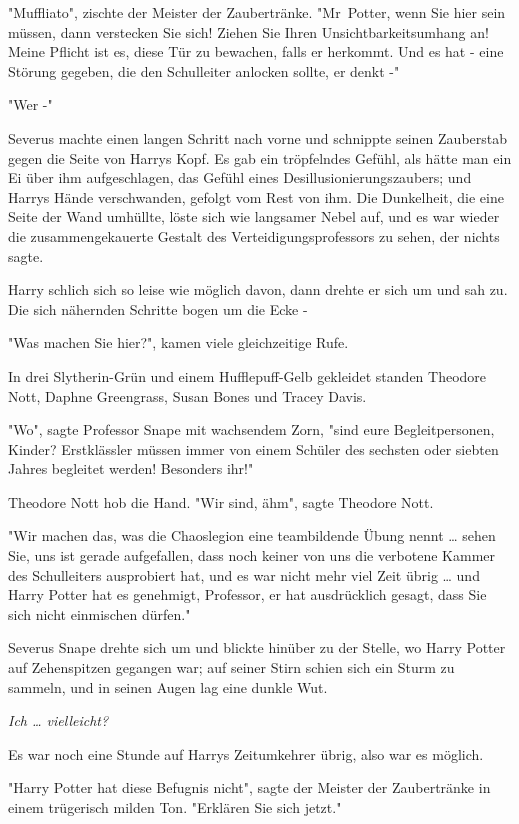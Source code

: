 {"Muffliato", zischte der Meister der Zaubertränke. "Mr~Potter, wenn Sie hier sein müssen, dann verstecken Sie sich! Ziehen Sie Ihren Unsichtbarkeitsumhang an! Meine Pflicht ist es, diese Tür zu bewachen, falls er herkommt. Und es hat - eine Störung gegeben, die den Schulleiter anlocken sollte, er denkt -"

"Wer -"

Severus machte einen langen Schritt nach vorne und schnippte seinen Zauberstab gegen die Seite von Harrys Kopf. Es gab ein tröpfelndes Gefühl, als hätte man ein Ei über ihm aufgeschlagen, das Gefühl eines Desillusionierungszaubers; und Harrys Hände verschwanden, gefolgt vom Rest von ihm. Die Dunkelheit, die eine Seite der Wand umhüllte, löste sich wie langsamer Nebel auf, und es war wieder die zusammengekauerte Gestalt des Verteidigungsprofessors zu sehen, der nichts sagte.

Harry schlich sich so leise wie möglich davon, dann drehte er sich um und sah zu. Die sich nähernden Schritte bogen um die Ecke -

"Was machen Sie hier?", kamen viele gleichzeitige Rufe.

In drei Slytherin-Grün und einem Hufflepuff-Gelb gekleidet standen Theodore Nott, Daphne Greengrass, Susan Bones und Tracey Davis.

"Wo", sagte Professor Snape mit wachsendem Zorn, "sind eure Begleitpersonen, Kinder? Erstklässler müssen immer von einem Schüler des sechsten oder siebten Jahres begleitet werden! Besonders ihr!"

Theodore Nott hob die Hand. "Wir sind, ähm", sagte Theodore Nott.

"Wir machen das, was die Chaoslegion eine teambildende Übung nennt … sehen Sie, uns ist gerade aufgefallen, dass noch keiner von uns die verbotene Kammer des Schulleiters ausprobiert hat, und es war nicht mehr viel Zeit übrig … und Harry Potter hat es genehmigt, Professor, er hat ausdrücklich gesagt, dass Sie sich nicht einmischen dürfen."

Severus Snape drehte sich um und blickte hinüber zu der Stelle, wo Harry Potter auf Zehenspitzen gegangen war; auf seiner Stirn schien sich ein Sturm zu sammeln, und in seinen Augen lag eine dunkle Wut.

\emph{Ich … vielleicht?}

Es war noch eine Stunde auf Harrys Zeitumkehrer übrig, also war es möglich.

"Harry Potter hat diese Befugnis nicht", sagte der Meister der Zaubertränke in einem trügerisch milden Ton. "Erklären Sie sich jetzt."

}

